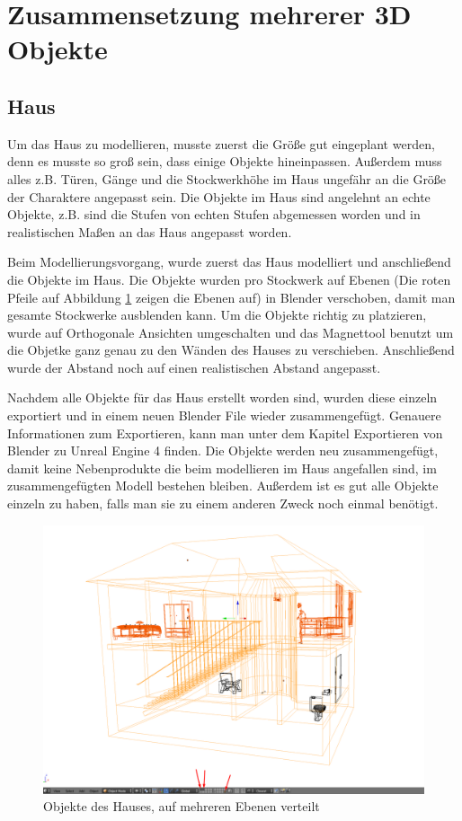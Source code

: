 \section{Zusammensetzung mehrerer 3D Objekte}
\subsection{Haus}
\label{haus:ref1}
Um das Haus zu modellieren, musste zuerst die Größe gut eingeplant werden, denn es musste so groß sein, dass einige Objekte hineinpassen.
Außerdem muss alles z.B. Türen, Gänge und die Stockwerkhöhe im Haus ungefähr an die Größe der Charaktere angepasst sein.
Die Objekte im Haus sind angelehnt an echte Objekte, z.B. sind die Stufen von echten Stufen abgemessen worden und in realistischen Maßen an das Haus angepasst worden.

Beim Modellierungsvorgang, wurde zuerst das Haus modelliert und anschließend die Objekte im Haus. Die Objekte wurden pro Stockwerk auf Ebenen (Die roten Pfeile auf Abbildung \ref{Haus:image1} zeigen
die Ebenen auf) in Blender verschoben, damit man gesamte Stockwerke ausblenden kann. Um die Objekte richtig zu platzieren, wurde auf Orthogonale Ansichten umgeschalten
und das Magnettool benutzt um die Objetke ganz genau zu den Wänden des Hauses zu verschieben. Anschließend wurde der Abstand noch auf einen realistischen Abstand angepasst.

Nachdem alle Objekte für das Haus erstellt worden sind, wurden diese einzeln exportiert und in einem neuen Blender File wieder zusammengefügt. Genauere Informationen zum Exportieren, kann
man unter dem Kapitel Exportieren von Blender zu Unreal Engine 4 finden.  Die Objekte werden neu zusammengefügt, damit keine Nebenprodukte die beim modellieren
im Haus angefallen sind, im zusammengefügten Modell bestehen bleiben. Außerdem ist es gut alle Objekte einzeln zu haben, falls man sie zu einem anderen Zweck noch einmal benötigt.

\begin{figure}[h]
    \centering
    \includegraphics[width=.8\textwidth]{images/Haus-zusammenfuegen_Ebenen.png}
    \caption{Objekte des Hauses, auf mehreren Ebenen verteilt}
    \label{Haus:image1}
\end{figure}